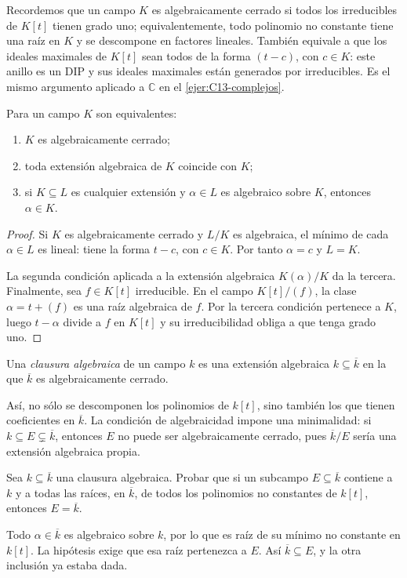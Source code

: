 Recordemos que un campo $K$ es algebraicamente cerrado si todos los irreducibles de $K[t]$ tienen grado uno; equivalentemente, todo polinomio no constante tiene una raíz en $K$ y se descompone en factores lineales. También equivale a que los ideales maximales de $K[t]$ sean todos de la forma $(t-c)$, con $c\in K$: este anillo es un DIP y sus ideales maximales están generados por irreducibles. Es el mismo argumento aplicado a $\mathbb C$ en el \cref{ejer:C13-complejos}.

\begin{lema}\label{lema:C24-cerrado}
Para un campo $K$ son equivalentes:
\begin{enumerate}[nosep]
\item $K$ es algebraicamente cerrado;
\item toda extensión algebraica de $K$ coincide con $K$;
\item si $K\subseteq L$ es cualquier extensión y $\alpha\in L$ es algebraico sobre $K$, entonces $\alpha\in K$.
\end{enumerate}
\end{lema}
\begin{proof}
Si $K$ es algebraicamente cerrado y $L/K$ es algebraica, el mínimo de cada $\alpha\in L$ es lineal: tiene la forma $t-c$, con $c\in K$. Por tanto $\alpha=c$ y $L=K$.

La segunda condición aplicada a la extensión algebraica $K(\alpha)/K$ da la tercera. Finalmente, sea $f\in K[t]$ irreducible. En el campo $K[t]/(f)$, la clase $\alpha=t+(f)$ es una raíz algebraica de $f$. Por la tercera condición pertenece a $K$, luego $t-\alpha$ divide a $f$ en $K[t]$ y su irreducibilidad obliga a que tenga grado uno.
\end{proof}

\begin{defi}
Una \emph{clausura algebraica} de un campo $k$ es una extensión algebraica $k\subseteq\overline k$ en la que $\overline k$ es algebraicamente cerrado.
\end{defi}
Así, no sólo se descomponen los polinomios de $k[t]$, sino también los que tienen coeficientes en $\overline k$. La condición de algebraicidad impone una minimalidad: si $k\subseteq E\subsetneq\overline k$, entonces $E$ no puede ser algebraicamente cerrado, pues $\overline k/E$ sería una extensión algebraica propia.

\begin{ejer}\label{ejer:C24-raices-clausura}
Sea $k\subseteq\overline k$ una clausura algebraica. Probar que si un subcampo $E\subseteq\overline k$ contiene a $k$ y a todas las raíces, en $\overline k$, de todos los polinomios no constantes de $k[t]$, entonces $E=\overline k$.
\end{ejer}
\begin{sol}
Todo $\alpha\in\overline k$ es algebraico sobre $k$, por lo que es raíz de su mínimo no constante en $k[t]$. La hipótesis exige que esa raíz pertenezca a $E$. Así $\overline k\subseteq E$, y la otra inclusión ya estaba dada.
\end{sol}

